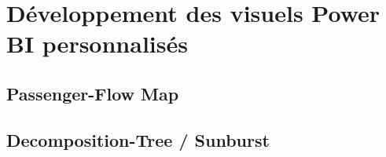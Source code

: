 \chapter{Développement des visuels Power BI personnalisés}
\label{chap:dev-visuels}

\makeatletter
\newcommand{\ActivateFourLettering}{%
  \renewcommand{\thesection}{\thechapter\@Alph\c@section}%
  \renewcommand{\thesubsection}{\thesection.\arabic{subsection}}%
  \renewcommand{\thesubsubsection}{\thesubsection.\arabic{subsubsection}}}%
\newcommand{\DeactivateFourLettering}{%
  \renewcommand{\thesection}{\thechapter.\arabic{section}}%
  \renewcommand{\thesubsection}{\thesection.\arabic{subsection}}%
  \renewcommand{\thesubsubsection}{\thesubsection.\arabic{subsubsection}}}
\makeatother
\ActivateFourLettering

\section{Passenger-Flow Map}       %








\section{Decomposition-Tree / Sunburst} %








\DeactivateFourLettering
